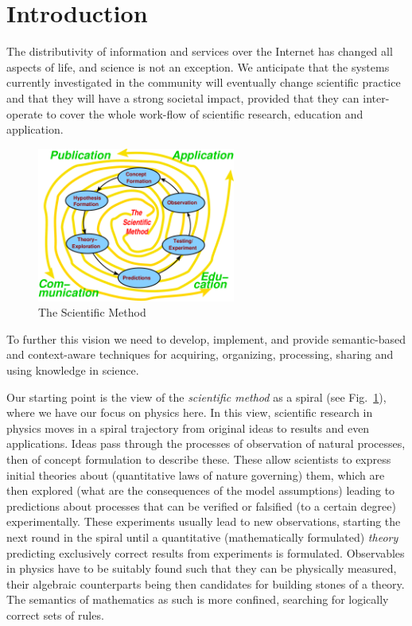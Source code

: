 \section{Introduction}\label{sec:intro}

The distributivity of information and services over the Internet has changed all aspects
of life, and science is not an exception. We anticipate that the systems currently
investigated in the community will eventually change scientific practice and that they
will have a strong societal impact, provided that they can inter-operate to cover the
whole work-flow of scientific research, education and application. 
\begin{figure}\vspace{-.6cm}
  \includegraphics[width=6.5cm]{sci-method}\vspace{-.3cm}
  \caption{The Scientific Method}\label{fig:nw-Methode}\vspace{-.6cm}
\end{figure}
To further this vision we need to develop, implement, and provide semantic-based and
context-aware techniques for acquiring, organizing, processing, sharing and using
knowledge in science.
 
Our starting point is the view of the {\emph{scientific method}} as a spiral (see
Fig.~\ref{fig:nw-Methode}), where we have our focus on physics here.  In this view,
scientific research in physics moves in a spiral trajectory from original ideas to results
and even applications. Ideas pass through the processes of observation of natural
processes, then of concept formulation to describe these. These allow scientists to
express initial theories about (quantitative laws of nature governing) them, which are
then explored (what are the consequences of the model assumptions) leading to predictions
about processes that can be verified or falsified (to a certain degree) experimentally.
These experiments usually lead to new observations, starting the next round in the spiral
until a quantitative (mathematically formulated) \textit{theory} predicting exclusively
correct results from experiments is formulated.  Observables in physics have to be
suitably found such that they can be physically measured, their algebraic counterparts
being then candidates for building stones of a theory.  The semantics of mathematics as
such is more confined, searching for logically correct sets of rules.

